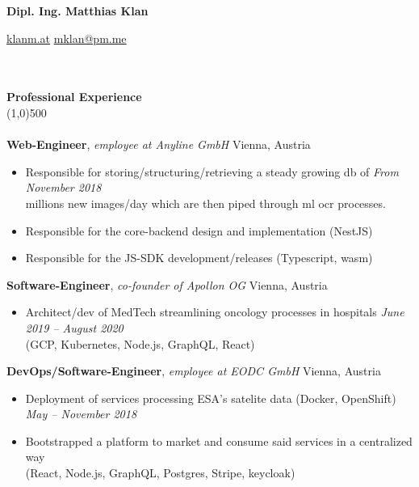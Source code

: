 \documentclass[9pt]{extarticle}
\begin{document}
\centerline{{\LARGE \bf Dipl. Ing. Matthias Klan}}
\centerline{\small \href{https://klanm.at}{klanm.at} \raisebox{0.25ex}{\tiny$\bullet$}  \href{mklan@pm.me}{mklan@pm.me}}

\noindent %
\\\\
{\Large \bf Professional Experience}\\
\line(1,0){500}\\
\\
\noindent
{\bf Web-Engineer}, \textit{employee at Anyline GmbH}  \hfill Vienna, Austria 
\begin{itemize}
\setlength\itemsep{0.05em}
\item Responsible for storing/structuring/retrieving a steady growing db of  \hfill \textit{From November 2018} \\ 
millions new images/day which are then piped through ml ocr processes.
\item Responsible for the core-backend design and implementation (NestJS)
\item Responsible for the JS-SDK development/releases (Typescript, wasm) \\
\end{itemize}

\noindent
{\bf Software-Engineer}, \textit{co-founder of Apollon OG}  \hfill Vienna, Austria
\begin{itemize}
\setlength\itemsep{0.05em}
\item Architect/dev of MedTech streamlining oncology processes in hospitals \hfill \textit{June 2019 -- August 2020} \\
(GCP, Kubernetes, Node.js, GraphQL, React) \\
\end{itemize}

\noindent
{\bf DevOps/Software-Engineer}, \textit{employee at EODC GmbH}  \hfill Vienna, Austria
\begin{itemize}
\setlength\itemsep{0.05em}
    \item Deployment of services processing ESA's satelite data (Docker, OpenShift) \hfill \textit{May -- November 2018}
    \item Bootstrapped a platform to market and consume said services in a centralized way \\
    (React, Node.js, GraphQL, Postgres, Stripe, keycloak) \\
\end{itemize}
\end{document}
